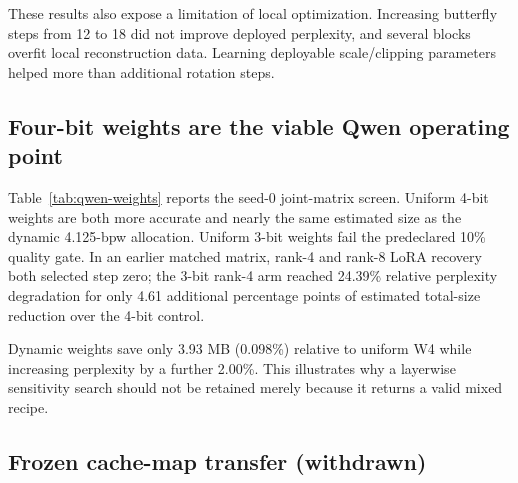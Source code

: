 \documentclass[10pt,twocolumn]{article}
\begin{document}
These results also expose a limitation of local optimization. Increasing
butterfly steps from 12 to 18 did not improve deployed perplexity, and several
blocks overfit local reconstruction data. Learning deployable scale/clipping
parameters helped more than additional rotation steps.

\subsection{Four-bit weights are the viable Qwen operating point}

Table~\ref{tab:qwen-weights} reports the seed-0 joint-matrix screen. Uniform
4-bit weights are both more accurate and nearly the same estimated size as the
dynamic 4.125-bpw allocation. Uniform 3-bit weights fail the predeclared 10\%
quality gate. In an earlier matched matrix, rank-4 and rank-8 LoRA recovery both
selected step zero; the 3-bit rank-4 arm reached 24.39\% relative perplexity
degradation for only 4.61 additional percentage points of estimated total-size
reduction over the 4-bit control.

\begin{table}[t]
\centering
\small
\caption{Qwen3.5-4B seed-0 weight screen. Complete sizes are logical estimates
that include unquantized components. Relative perplexity is measured against
the matched 13.9001 source run.}
\label{tab:qwen-weights}
\end{table}

Dynamic weights save only 3.93 MB (0.098\%) relative to uniform W4 while
increasing perplexity by a further 2.00\%. This illustrates why a layerwise
sensitivity search should not be retained merely because it returns a valid
mixed recipe.

\subsection{Frozen cache-map transfer (withdrawn)}
\end{document}

